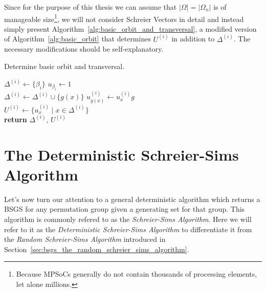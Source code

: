 Since for the purpose of this thesis we can assume that $|\Omega| = |\Omega_n|$
is of manageable size\footnote{Because MPSoCs generally do not contain thousands of
processing elements, let alone millions.}, we will not consider Schreier Vectors
in detail and instead simply present
Algorithm~\ref{alg:basic_orbit_and_transversal}, a modified version of
Algorithm~\ref{alg:basic_orbit} that determines $U^{(i)}$ in addition to
$\Delta^{(i)}$. The necessary modifications should be self-explanatory.

\begin{algorithm}
  \caption{Determine basic orbit and transversal.}
  \label{alg:basic_orbit_and_transversal}
  \begin{algorithmic}[1]
       \State $\Delta^{(i)} \gets \{\beta_i\}$
       \State $u_{\beta_i} \gets 1$
       \\
              \State $\Delta^{(i)} \gets \Delta^{(i)} \cup \{g(x)\}$
              \State $u_{g(x)}^{(i)} \gets u_x^{(i)} g$
            \EndIf
         \EndFor
       \EndWhile
       \\
       \State $U^{(i)} \gets \{u_x^{(i)} \mid x \in \Delta^{(i)}\}$
       \\
       \State \textbf{return} $\Delta^{(i)}$, $U^{(i)}$
    \EndProcedure
  \end{algorithmic}
\end{algorithm}

\section{The Deterministic Schreier-Sims Algorithm}
\label{sec:bsgs_the_deterministic_schreier_sims_algorithm}

Let's now turn our attention to a general deterministic algorithm which returns
a BSGS for any permutation group given a generating set for that group. This
algorithm is commonly refered to as the \textit{Schreier-Sims Algorithm}. Here
we will refer to it as the \textit{Deterministic Schreier-Sims Algorithm} to
differentiate it from the \textit{Random Schreier-Sims Algorithm} introduced in
Section~\ref{sec:bsgs_the_random_schreier_sims_algorithm}.

